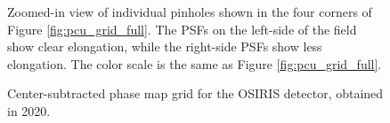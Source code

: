 \documentclass[]{spie}  %
\begin{document}
\begin{figure}[!h]
 \vspace{-20mm}
 \caption{\footnotesize Zoomed-in view of individual pinholes shown in the four corners of Figure \ref{fig:pcu_grid_full}. The PSFs on the left-side of the field show clear elongation, while the right-side PSFs show less elongation. The color scale is the same as Figure \ref{fig:pcu_grid_full}. \label{fig:pcu_grid_corners}}
\end{figure}

\begin{figure}[!h]
 \caption{\footnotesize Center-subtracted phase map grid for the OSIRIS detector, obtained in 2020. \label{fig:phase-map-grid}}
\end{figure}
\end{document}
